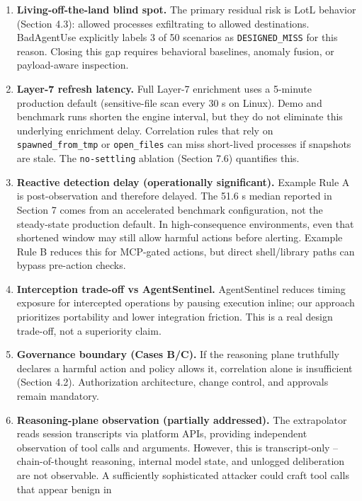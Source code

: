\documentclass[
]{article}
\providecommand{\tightlist}{%
  \setlength{\itemsep}{0pt}\setlength{\parskip}{0pt}}
\begin{document}
\begin{enumerate}
\def\labelenumi{\arabic{enumi}.}
\tightlist
\item
  \textbf{Living-off-the-land blind spot.} The primary residual risk is
  LotL behavior (Section 4.3): allowed processes exfiltrating to allowed
  destinations. BadAgentUse explicitly labels 3 of 50 scenarios as
  \texttt{DESIGNED\_MISS} for this reason. Closing this gap requires
  behavioral baselines, anomaly fusion, or payload-aware inspection.
\item
  \textbf{Layer-7 refresh latency.} Full Layer-7 enrichment uses a
  5-minute production default (sensitive-file scan every 30 s on Linux).
  Demo and benchmark runs shorten the engine interval, but they do not
  eliminate this underlying enrichment delay. Correlation rules that
  rely on \texttt{spawned\_from\_tmp} or \texttt{open\_files} can miss
  short-lived processes if snapshots are stale. The \texttt{no-settling}
  ablation (Section 7.6) quantifies this.
\item
  \textbf{Reactive detection delay (operationally significant).} Example
  Rule A is post-observation and therefore delayed. The 51.6 s median
  reported in Section 7 comes from an accelerated benchmark
  configuration, not the steady-state production default. In
  high-consequence environments, even that shortened window may still
  allow harmful actions before alerting. Example Rule B reduces this for
  MCP-gated actions, but direct shell/library paths can bypass
  pre-action checks.
\item
  \textbf{Interception trade-off vs AgentSentinel.} AgentSentinel
  reduces timing exposure for intercepted operations by pausing
  execution inline; our approach prioritizes portability and lower
  integration friction. This is a real design trade-off, not a
  superiority claim.
\item
  \textbf{Governance boundary (Cases B/C).} If the reasoning plane
  truthfully declares a harmful action and policy allows it, correlation
  alone is insufficient (Section 4.2). Authorization architecture,
  change control, and approvals remain mandatory.
\item
  \textbf{Reasoning-plane observation (partially addressed).} The
  extrapolator reads session transcripts via platform APIs, providing
  independent observation of tool calls and arguments. However, this is
  transcript-only -- chain-of-thought reasoning, internal model state,
  and unlogged deliberation are not observable. A sufficiently
  sophisticated attacker could craft tool calls that appear benign in

\end{enumerate}
\end{document}
